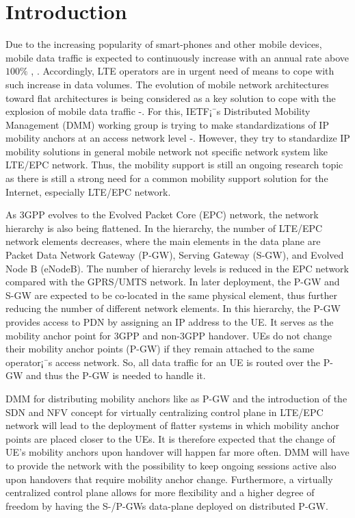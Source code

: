 \documentclass[runningheads,a4paper]{llncs}
\begin{document}
\section{Introduction}
Due to the increasing popularity of smart-phones and other mobile devices, mobile data traffic is expected to continuously increase with an annual rate above $100\%$ \cite{ref1}, \cite{ref2}. Accordingly, LTE operators are in urgent need of means to cope with such increase in data volumes. The evolution of mobile network architectures toward flat architectures is being considered as a key solution to cope with the explosion of mobile data traffic \cite{ref3}-\cite{ref5}. For this, IETF¡¯s Distributed Mobility Management (DMM) working group is trying to make standardizations of IP mobility anchors at an access network level \cite{ref6}-\cite{ref9}. However, they try to standardize IP mobility solutions in general mobile network not specific network system like LTE/EPC network. Thus, the mobility support is still an ongoing research topic as there is still a strong need for a common mobility support solution for the Internet, especially LTE/EPC network.

As 3GPP evolves to the Evolved Packet Core (EPC) network, the network hierarchy is also being flattened. In the hierarchy, the number of LTE/EPC network elements decreases, where the main elements in the data plane are Packet Data Network Gateway (P-GW), Serving Gateway (S-GW), and Evolved Node B (eNodeB). The number of hierarchy levels is reduced in the EPC network compared with the GPRS/UMTS network. In later deployment, the P-GW and S-GW are expected to be co-located in the same physical element, thus further reducing the number of different network elements. In this hierarchy, the P-GW provides access to PDN by assigning an IP address to the UE. It serves as the mobility anchor point for 3GPP and non-3GPP handover. UEs do not change their mobility anchor points (P-GW) if they remain attached to the same operator¡¯s access network. So, all data traffic for an UE is routed over the P-GW and thus the P-GW is needed to handle it.

DMM for distributing mobility anchors like as P-GW and the introduction of the SDN and NFV concept for virtually centralizing control plane in LTE/EPC network will lead to the deployment of flatter systems in which mobility anchor points are placed closer to the UEs. It is therefore expected that the change of UE's mobility anchors upon handover will happen far more often. DMM will have to provide the network with the possibility to keep ongoing sessions active also upon handovers that require mobility anchor change. Furthermore, a virtually centralized control plane allows for more flexibility and a higher degree of freedom by having the S-/P-GWs data-plane deployed on distributed P-GW.
\end{document}
